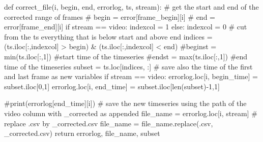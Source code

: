 \documentclass[
  letterpaper,
  DIV=11,
  numbers=noendperiod]{scrreprt}
\newenvironment{Shaded}{\begin{snugshade}}{\end{snugshade}}
\newcommand{\BuiltInTok}[1]{\textcolor[rgb]{0.00,0.23,0.31}{#1}}
\newcommand{\CommentTok}[1]{\textcolor[rgb]{0.37,0.37,0.37}{#1}}
\newcommand{\ControlFlowTok}[1]{\textcolor[rgb]{0.00,0.23,0.31}{#1}}
\newcommand{\DecValTok}[1]{\textcolor[rgb]{0.68,0.00,0.00}{#1}}
\newcommand{\KeywordTok}[1]{\textcolor[rgb]{0.00,0.23,0.31}{#1}}
\newcommand{\NormalTok}[1]{\textcolor[rgb]{0.00,0.23,0.31}{#1}}
\newcommand{\OperatorTok}[1]{\textcolor[rgb]{0.37,0.37,0.37}{#1}}
\newcommand{\StringTok}[1]{\textcolor[rgb]{0.13,0.47,0.30}{#1}}
\begin{document}
\begin{Shaded}
\begin{Highlighting}[]
\KeywordTok{def}\NormalTok{ correct\_file(i, begin, end, errorlog, ts, stream):}
    \CommentTok{\# get the start and end of the corrected range of frames}
    \CommentTok{\# begin = error[\textquotesingle{}frame\_begin\textquotesingle{}][i]}
    \CommentTok{\# end = error[\textquotesingle{}frame\_end\textquotesingle{}][i]}
    \ControlFlowTok{if}\NormalTok{ stream }\OperatorTok{==} \StringTok{\textquotesingle{}video\textquotesingle{}}\NormalTok{:}
\NormalTok{        indexcol }\OperatorTok{=} \DecValTok{1}
    \ControlFlowTok{else}\NormalTok{:}
\NormalTok{        indexcol }\OperatorTok{=} \DecValTok{0}
    \CommentTok{\# cut from the ts everything that is below start and above end}
\NormalTok{    indices }\OperatorTok{=}\NormalTok{ (ts.iloc[:,indexcol] }\OperatorTok{\textgreater{}}\NormalTok{ begin) }\OperatorTok{\&}\NormalTok{ (ts.iloc[:,indexcol] }\OperatorTok{\textless{}}\NormalTok{ end)}
    \CommentTok{\#beginst = min(ts.iloc[:,1]) \#start time of the timeseries}
    \CommentTok{\#endst = max(ts.iloc[:,1])  \#end time of the timeseries}
\NormalTok{    subset }\OperatorTok{=}\NormalTok{ ts.loc[indices, :]}
    \CommentTok{\# save also the time of the first and last frame as new variables}
    \ControlFlowTok{if}\NormalTok{ stream }\OperatorTok{==} \StringTok{\textquotesingle{}video\textquotesingle{}}\NormalTok{:}
\NormalTok{        errorlog.loc[i, }\StringTok{\textquotesingle{}begin\_time\textquotesingle{}}\NormalTok{] }\OperatorTok{=}\NormalTok{ subset.iloc[}\DecValTok{0}\NormalTok{,}\DecValTok{1}\NormalTok{]}
\NormalTok{        errorlog.loc[i, }\StringTok{\textquotesingle{}end\_time\textquotesingle{}}\NormalTok{] }\OperatorTok{=}\NormalTok{ subset.iloc[}\BuiltInTok{len}\NormalTok{(subset)}\OperatorTok{{-}}\DecValTok{1}\NormalTok{,}\DecValTok{1}\NormalTok{]}

    \CommentTok{\#print(errorlog[\textquotesingle{}end\_time\textquotesingle{}][i])}
    \CommentTok{\# save the new timeseries using the path of the video column with \_corrected as appended}
\NormalTok{    file\_name }\OperatorTok{=}\NormalTok{ errorlog.loc[i, stream]}
    \CommentTok{\# replace .csv by \_corrected.csv}
\NormalTok{    file\_name }\OperatorTok{=}\NormalTok{ file\_name.replace(}\StringTok{\textquotesingle{}.csv\textquotesingle{}}\NormalTok{, }\StringTok{\textquotesingle{}\_corrected.csv\textquotesingle{}}\NormalTok{)}
    \ControlFlowTok{return}\NormalTok{ errorlog, file\_name, subset}
\end{Highlighting}
\end{Shaded}
\end{document}
